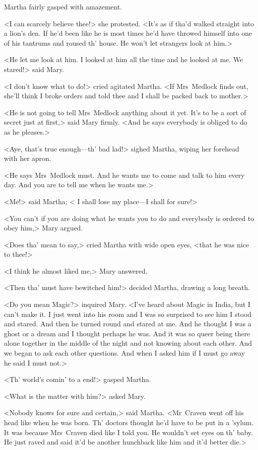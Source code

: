 Martha fairly gasped with amazement.

<I can scarcely believe thee!> she protested. <It's as if tha'd walked straight into a lion's den. If he'd been like he is most times he'd have throwed himself into one of his tantrums and roused th' house. He won't let strangers look at him.>

<He let me look at him. I looked at him all the time and he looked at me. We stared!> said Mary.

<I don't know what to do!> cried agitated Martha. <If Mrs~Medlock finds out, she'll think I broke orders and told thee and I shall be packed back to mother.>

<He is not going to tell Mrs~Medlock anything about it yet. It's to be a sort of secret just at first,> said Mary firmly. <And he says everybody is obliged to do as he pleases.>

<Aye, that's true enough—th' bad lad!> sighed Martha, wiping her forehead with her apron.

<He says Mrs~Medlock must. And he wants me to come and talk to him every day. And you are to tell me when he wants me.>

<Me!> said Martha; < I shall lose my place—I shall for sure!>

<You can't if you are doing what he wants you to do and everybody is ordered to obey him,> Mary argued.

<Does tha' mean to say,> cried Martha with wide open eyes, <that he was nice to thee!>

<I think he almost liked me,> Mary answered.

<Then tha' must have bewitched him!> decided Martha, drawing a long breath.

<Do you mean Magic?> inquired Mary. <I've heard about Magic in India, but I can't make it. I just went into his room and I was so surprised to see him I stood and stared. And then he turned round and stared at me. And he thought I was a ghost or a dream and I thought perhaps he was. And it was so queer being there alone together in the middle of the night and not knowing about each other. And we began to ask each other questions. And when I asked him if I must go away he said I must not.>

<Th' world's comin' to a end!> gasped Martha.

<What is the matter with him?> asked Mary.

<Nobody knows for sure and certain,> said Martha. <Mr~Craven went off his head like when he was born. Th' doctors thought he'd have to be put in a 'sylum. It was because Mrs~Craven died like I told you. He wouldn't set eyes on th' baby. He just raved and said it'd be another hunchback like him and it'd better die.>


